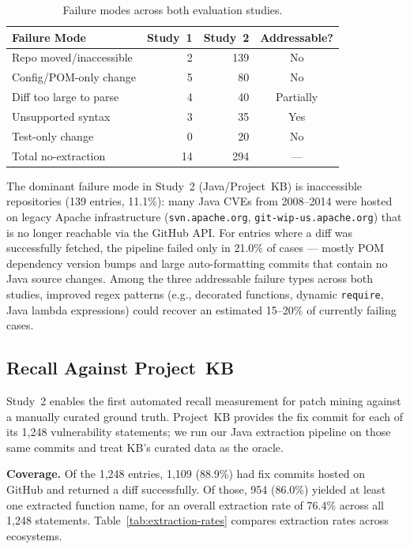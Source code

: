 \documentclass[sigconf,nonacm]{acmart}
\begin{document}
\begin{table}[t]
    \centering
    \caption{Failure modes across both evaluation studies.}
    \label{tab:failures}
    \begin{tabular}{lrrc}
        \toprule
        \textbf{Failure Mode} & \textbf{Study~1} & \textbf{Study~2} & \textbf{Addressable?} \\
        \midrule
        Repo moved/inaccessible  &  2 & 139 & No \\
        Config/POM-only change   &  5 &  80 & No \\
        Diff too large to parse  &  4 &  40 & Partially \\
        Unsupported syntax       &  3 &  35 & Yes \\
        Test-only change         &  0 &  20 & No \\
        \midrule
        Total no-extraction      & 14 & 294 & --- \\
        \bottomrule
    \end{tabular}
\end{table}

The dominant failure mode in Study~2 (Java/Project~KB) is inaccessible
repositories (139 entries, 11.1\%): many Java CVEs from 2008--2014 were
hosted on legacy Apache infrastructure (\texttt{svn.apache.org},
\texttt{git-wip-us.apache.org}) that is no longer reachable via the
GitHub API.
For entries where a diff was successfully fetched, the pipeline failed
only in 21.0\% of cases --- mostly POM dependency version bumps and
large auto-formatting commits that contain no Java source changes.
Among the three addressable failure types across both studies, improved
regex patterns (e.g., decorated functions, dynamic \texttt{require},
Java lambda expressions) could recover an estimated 15--20\% of
currently failing cases.

\subsection{Recall Against Project~KB}
\label{subsec:recall}

Study~2 enables the first automated recall measurement for patch mining
against a manually curated ground truth.
Project~KB provides the fix commit for each of its 1{,}248 vulnerability
statements; we run our Java extraction pipeline on those same commits
and treat KB's curated data as the oracle.

\textbf{Coverage.}
Of the 1{,}248 entries, 1{,}109 (88.9\%) had fix commits hosted on
GitHub and returned a diff successfully.
Of those, 954 (86.0\%) yielded at least one extracted function name,
for an overall extraction rate of 76.4\% across all 1{,}248 statements.
Table~\ref{tab:extraction-rates} compares extraction rates across
ecosystems.
\end{document}
